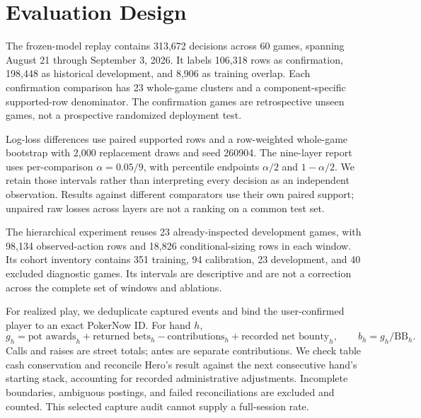 \documentclass[11pt]{article}
\begin{document}
\section{Evaluation Design}
The frozen-model replay contains 313,672 decisions across 60 games, spanning August 21 through September 3, 2026. It labels 106,318 rows as confirmation, 198,448 as historical development, and 8,906 as training overlap. Each confirmation comparison has 23 whole-game clusters and a component-specific supported-row denominator. The confirmation games are retrospective unseen games, not a prospective randomized deployment test.

Log-loss differences use paired supported rows and a row-weighted whole-game bootstrap with 2,000 replacement draws and seed 260904. The nine-layer report uses per-comparison \(\alpha=0.05/9\), with percentile endpoints \(\alpha/2\) and \(1-\alpha/2\). We retain those intervals rather than interpreting every decision as an independent observation. Results against different comparators use their own paired support; unpaired raw losses across layers are not a ranking on a common test set.

The hierarchical experiment reuses 23 already-inspected development games, with 98,134 observed-action rows and 18,826 conditional-sizing rows in each window. Its cohort inventory contains 351 training, 94 calibration, 23 development, and 40 excluded diagnostic games. Its intervals are descriptive and are not a correction across the complete set of windows and ablations.

For realized play, we deduplicate captured events and bind the user-confirmed player to an exact PokerNow ID. For hand \(h\),
\begin{equation}
g_h=\text{pot awards}_h+\text{returned bets}_h-\text{contributions}_h+
\text{recorded net bounty}_h,\qquad b_h=g_h/\mathrm{BB}_h.
\end{equation}
Calls and raises are street totals; antes are separate contributions. We check table cash conservation and reconcile Hero's result against the next consecutive hand's starting stack, accounting for recorded administrative adjustments. Incomplete boundaries, ambiguous postings, and failed reconciliations are excluded and counted. This selected capture audit cannot supply a full-session rate.
\end{document}
